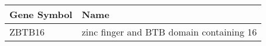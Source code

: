 \begin{tabular}{ll}
\toprule
Gene Symbol &                                     Name \\
\midrule
     ZBTB16 & zinc finger and BTB domain containing 16 \\
\bottomrule
\end{tabular}
